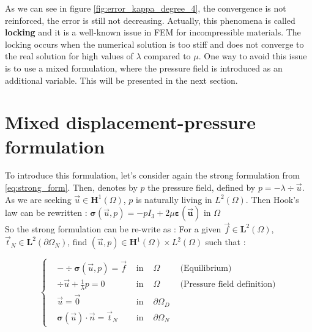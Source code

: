\documentclass[a4paper,12pt,twoside]{report}
\begin{document}
As we can see in figure \ref{fig:error_kappa_degree_4}, the convergence is not reinforced, the error is still not decreasing. Actually, this phenomena is called \textbf{locking} and it is a well-known issue in FEM for incompressible materials. The locking occurs when the numerical solution is too stiff and does not converge to the real solution for high values of $\lambda$ compared to $\mu$.
One way to avoid this issue is to use a mixed formulation, where the pressure field is introduced as an additional variable. This will be presented in the next section.

\section{Mixed displacement-pressure formulation}
To introduce this formulation, let's consider again the strong formulation from \eqref{eq:strong_form}. Then, denotes by $p$ the pressure field, defined by $\displaystyle p = - \lambda \div{\vec u}$. As we are seeking $\vec u \in \boldsymbol{H}^1(\Omega)$, $p$ is naturally living in $L^2(\Omega)$. Then Hook's law can be rewritten : $\boldsymbol{\sigma} (\vec u,p) = -p I_3 + 2\mu \boldsymbol{\varepsilon(\vec u)} \text{ in }  \Omega $ \\
So the strong formulation can be re-write as : For a given $\vec f \in \boldsymbol L^2(\Omega)$, $\vec t_N \in \boldsymbol L^2(\partial \Omega_N)$, find $(\vec u, p) \in \boldsymbol H^1(\Omega)\times L^2(\Omega)$ such that : 

\begin{tcolorbox}
\begin{equation}
	\label{eq:strong_pressure_disp_form}
	\left\{
	\begin{aligned}
		& - \div \boldsymbol{\sigma} (\vec u,p) = \vec f & \text{ in } & \Omega \hspace{1cm} \text{(Equilibrium)}\\
		& \div{\vec u} + \frac{1}{\lambda} p = 0 & \text{ in } & \Omega \hspace{1cm} \text{(Pressure field definition)} \\
		& \vec u = \vec 0 & \text{ in } &\partial \Omega_D \\
		& \boldsymbol{\sigma} (\vec u) \cdot \vec n = \vec t_N & \text{ in }& \partial \Omega_N
	\end{aligned}
	\right.
\end{equation}
\end{tcolorbox}
\end{document}
